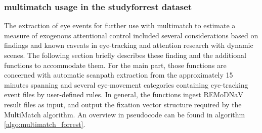 \documentclass[a4paper, 12pt]{scrreprt}
\begin{document}
\subsubsection{multimatch usage in the studyforrest dataset}
The extraction of eye events for further use with multimatch to estimate a measure of exogenous attentional control included several considerations based on findings and known caveats in eye-tracking and attention research with dynamic scenes. The following section briefly describes these finding and the additional functions to accommodate them. For the main part, those functions are concerned with automatic scanpath extraction from the approximately 15 minutes spanning and several eye-movement categories containing eye-tracking event files by user-defined rules. In general, the functions ingest REMoDNaV result files as input, and output the fixation vector structure required by the MultiMatch algorithm. An overview in pseudocode can be found in algorithm \ref{algo:multimatch_forrest}. \newline
\end{document}
